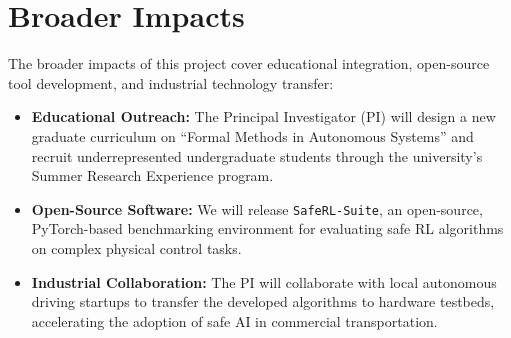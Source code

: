 \section{Broader Impacts}
The broader impacts of this project cover educational integration, open-source tool development, and industrial technology transfer:
\begin{itemize}
    \item \textbf{Educational Outreach:} The Principal Investigator (PI) will design a new graduate curriculum on ``Formal Methods in Autonomous Systems'' and recruit underrepresented undergraduate students through the university's Summer Research Experience program.
    \item \textbf{Open-Source Software:} We will release \texttt{SafeRL-Suite}, an open-source, PyTorch-based benchmarking environment for evaluating safe RL algorithms on complex physical control tasks.
    \item \textbf{Industrial Collaboration:} The PI will collaborate with local autonomous driving startups to transfer the developed algorithms to hardware testbeds, accelerating the adoption of safe AI in commercial transportation.
\end{itemize}
